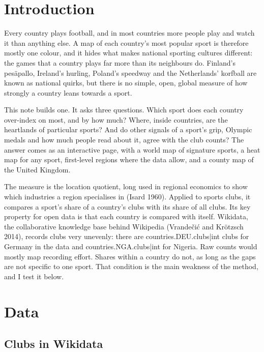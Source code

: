 \documentclass[11pt,a4paper]{article}
\begin{document}
\section{Introduction}

Every country plays football, and in most countries more people play and watch it than anything else. A map of each country's most popular sport is therefore mostly one colour, and it hides what makes national sporting cultures different: the games that a country plays far more than its neighbours do. Finland's pesäpallo, Ireland's hurling, Poland's speedway and the Netherlands' korfball are known as national quirks, but there is no simple, open, global measure of how strongly a country leans towards a sport.

This note builds one. It asks three questions. Which sport does each country over-index on most, and by how much? Where, inside countries, are the heartlands of particular sports? And do other signals of a sport's grip, Olympic medals and how much people read about it, agree with the club counts? The answer comes as an interactive page, with a world map of signature sports, a heat map for any sport, first-level regions where the data allow, and a county map of the United Kingdom.

The measure is the location quotient, long used in regional economics to show which industries a region specialises in (Isard 1960). Applied to sports clubs, it compares a sport's share of a country's clubs with its share of all clubs. Its key property for open data is that each country is compared with itself. Wikidata, the collaborative knowledge base behind Wikipedia (Vrandečić and Krötzsch 2014), records clubs very unevenly: there are {{countries.DEU.clubs|int}} clubs for Germany in the data and {{countries.NGA.clubs|int}} for Nigeria. Raw counts would mostly map recording effort. Shares within a country do not, as long as the gaps are not specific to one sport. That condition is the main weakness of the method, and I test it below.

\section{Data}

\subsection{Clubs in Wikidata}
\end{document}
